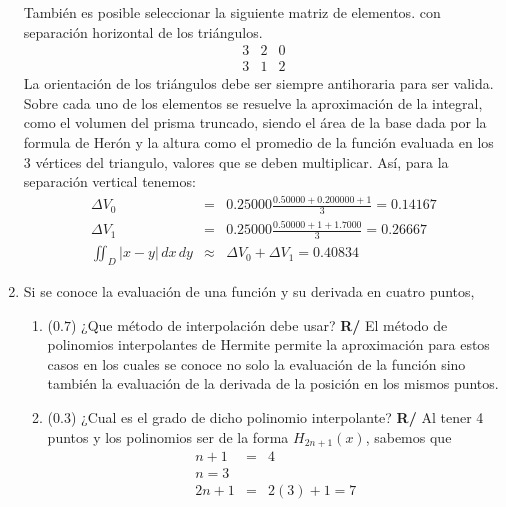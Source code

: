 \documentclass[12pt]{article}
\begin{document}
\begin{enumerate}[leftmargin=*,widest=9]
\[\]
También es posible seleccionar la siguiente matriz de elementos. con separación horizontal de los triángulos.
\[
\begin{array}{ccc}
3 & 2 & 0\\
3 & 1 & 2
\end{array}
\]
La orientación de los triángulos debe ser siempre antihoraria para ser valida.
Sobre cada uno de los elementos se resuelve la aproximación de la integral, como el volumen del prisma truncado, siendo el área de la base dada por la formula de Herón y la altura como el promedio de la función evaluada en los 3 vértices del triangulo, valores que se deben multiplicar.
Así, para la separación vertical tenemos:
\begin{eqnarray*}
\Delta V_0 &=& 0.25000 \frac{0.50000+0.200000+1}{3} = 0.14167\\
\Delta V_1 &=& 0.25000 \frac{0.50000+1+1.7000}{3} = 0.26667\\
\iint_D |x-y|\,dx\,dy &\approx & \Delta V_0 + \Delta V_1 = 0.40834
\end{eqnarray*}
    \item Si se conoce la evaluación de una función y su derivada en cuatro puntos,
   \begin{enumerate}[label=\alph*]
    \item (\(0.7\)) ¿Que método de interpolación debe usar?
    \textbf{R/} El método de polinomios interpolantes de Hermite permite la aproximación para estos casos en los cuales se conoce no solo la evaluación de la función sino también la evaluación de la derivada de la posición en los mismos puntos.
    \item (\(0.3\)) ¿Cual es el grado de dicho polinomio interpolante?
	\textbf{R/} Al tener 4 puntos y los polinomios ser de la forma \(H_{2n+1}(x)\), sabemos que
	\begin{eqnarray*}
	n + 1 &=& 4\\
	n = 3 \\
	2n + 1 &=& 2(3)+1 = 7
\end{eqnarray*}
    \end{enumerate}
\end{enumerate}
\end{document}
